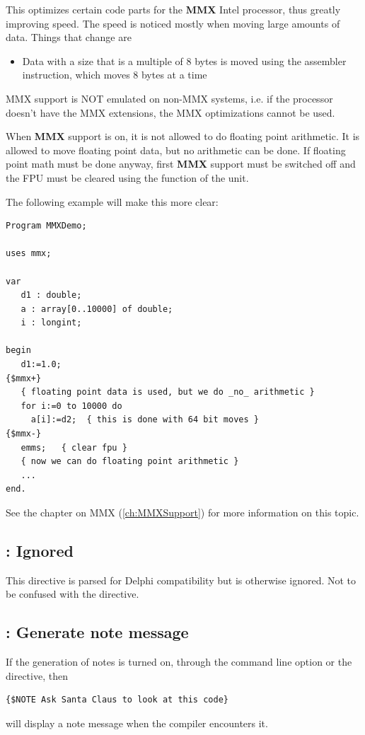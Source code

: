 This optimizes certain code parts for the \textbf{MMX} Intel
processor, thus greatly improving speed. The speed is noticed mostly when
moving large amounts of data. Things that change are
\begin{itemize}
\item Data with a size that is a multiple of 8 bytes is moved using the
 assembler instruction, which moves 8 bytes at a time
\end{itemize}
\begin{remark}MMX support is NOT emulated on non-MMX systems, i.e. if
the processor doesn't have the MMX extensions, the MMX optimizations cannot
be used.
\end{remark}
When \textbf{MMX} support is on, it is not allowed to do floating point
arithmetic. It is allowed to move floating point data, but no arithmetic
can be done. If floating point math must be done anyway, first \textbf{MMX}
 support must be switched off and the FPU must be cleared using the 
function of the  unit.

The following example will make this more clear:
\begin{verbatim}
Program MMXDemo;

uses mmx;

var
   d1 : double;
   a : array[0..10000] of double;
   i : longint;

begin
   d1:=1.0;
{$mmx+}
   { floating point data is used, but we do _no_ arithmetic }
   for i:=0 to 10000 do
     a[i]:=d2;  { this is done with 64 bit moves }
{$mmx-}
   emms;   { clear fpu }
   { now we can do floating point arithmetic }
   ...
end.
\end{verbatim}
See the chapter on MMX (\ref{ch:MMXSupport}) for more information
on this topic.

\subsection{ : Ignored}
This directive is parsed for Delphi compatibility but is otherwise ignored.
Not to be confused with the  directive.

\subsection{ : Generate note message}

If the generation of notes is turned on, through the  command line
option or the  directive, then
\begin{verbatim}
{$NOTE Ask Santa Claus to look at this code}
\end{verbatim}
will display a note message when the compiler encounters it.


